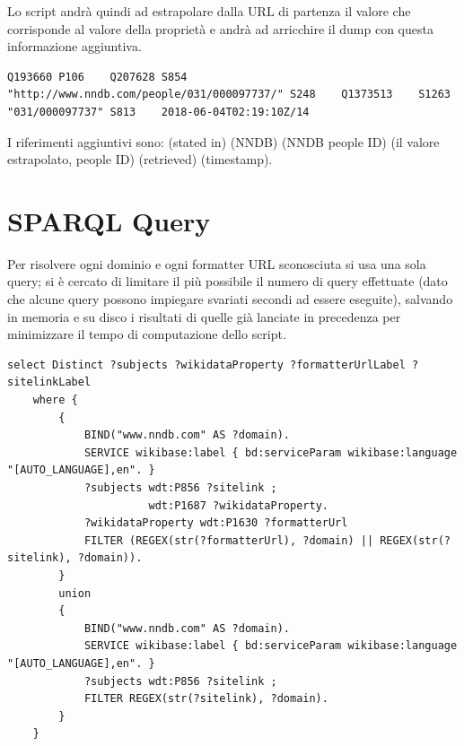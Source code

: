 Lo script andrà quindi ad estrapolare dalla URL di partenza il valore  che corrisponde al valore della proprietà  e andrà ad arricchire il dump 
con questa informazione aggiuntiva.

\begin{lstlisting}[style=QuickstatementsStyle, caption=Risultato dello script]
    Q193660	P106	Q207628	S854	"http://www.nndb.com/people/031/000097737/"	S248	Q1373513	S1263	"031/000097737"	S813	2018-06-04T02:19:10Z/14
\end{lstlisting}

I riferimenti aggiuntivi sono: 
\href{https://www.wikidata.org/wiki/Property:P248}{} (stated in)
\href{https://www.wikidata.org/wiki/Q1373513}{} (NNDB)
\href{https://www.wikidata.org/wiki/Property:P1263}{} (NNDB people ID)
 (il valore estrapolato, people ID)
\href{https://www.wikidata.org/wiki/Property:P813}{} (retrieved)
 (timestamp).

\section{SPARQL Query}
Per risolvere ogni dominio e ogni formatter URL sconosciuta si usa una sola query; si è cercato di limitare il più possibile il numero di query effettuate 
(dato che alcune query possono impiegare svariati secondi ad essere eseguite), 
salvando in memoria e su disco i risultati di quelle già lanciate in precedenza per minimizzare il tempo di computazione dello script.

\begin{lstlisting}[style=SPARQLStyle, caption=SPARQL query per cercare item e proprietà relativi al dominio \code{"www.nndb.com"}]
    select Distinct ?subjects ?wikidataProperty ?formatterUrlLabel ?sitelinkLabel
    where {
        {
            BIND("www.nndb.com" AS ?domain).
            SERVICE wikibase:label { bd:serviceParam wikibase:language "[AUTO_LANGUAGE],en". }
            ?subjects wdt:P856 ?sitelink ;
                      wdt:P1687 ?wikidataProperty.
            ?wikidataProperty wdt:P1630 ?formatterUrl
            FILTER (REGEX(str(?formatterUrl), ?domain) || REGEX(str(?sitelink), ?domain)).
        }
        union
        {
            BIND("www.nndb.com" AS ?domain).
            SERVICE wikibase:label { bd:serviceParam wikibase:language "[AUTO_LANGUAGE],en". }
            ?subjects wdt:P856 ?sitelink ;
            FILTER REGEX(str(?sitelink), ?domain).
        }
    }
\end{lstlisting}

